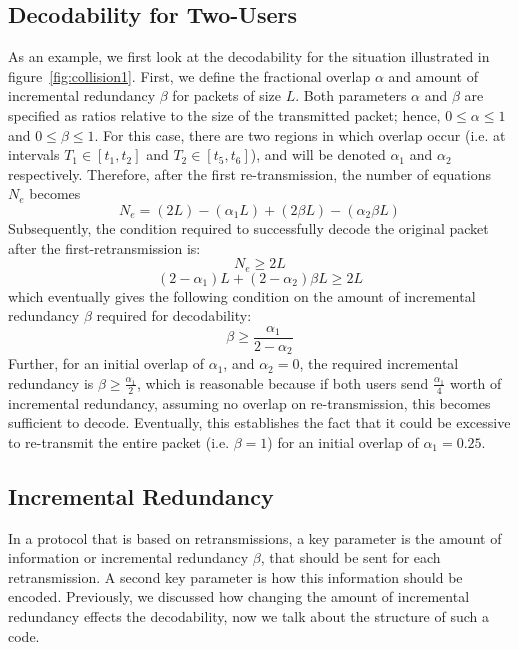 \subsection{Decodability for Two-Users}
\label{sec:two-user}
As an example, we first look at the decodability for the situation illustrated in figure~\ref{fig:collision1}. First, we define the fractional overlap $\alpha$ and amount of incremental redundancy $\beta$ for packets of size $L$. Both parameters $\alpha$ and $\beta$ are specified as ratios relative to the size of the transmitted packet; hence, $0\leq\alpha\leq1$ and $0\leq\beta\leq1$. For this case, there are two regions in which overlap occur (i.e. at intervals $T_1\in[t_1,t_2]$ and $T_2\in[t_5,t_6]$), and will be denoted $\alpha_1$ and $\alpha_2$ respectively. Therefore, after the first re-transmission, the number of equations $N_e$ becomes
\begin{equation}
\label{eq:Ne1}
N_e = (2L)-(\alpha_1 L)+(2\beta L)-(\alpha_2\beta L)
\end{equation}
Subsequently, the condition required to successfully decode the original packet after the first-retransmission is:
\begin{equation}
N_e \geq 2L
\end{equation}
\begin{equation}
(2-\alpha_1)L + (2-\alpha_2)\beta L \geq 2L
\end{equation}
which eventually gives the following condition on the amount of incremental redundancy $\beta$ required for decodability:
\begin{equation}
\beta \geq \frac{\alpha_1}{2-\alpha_2}
\end{equation}
Further, for an initial overlap of $\alpha_1$, and $\alpha_2=0$, the required incremental redundancy is $\beta \geq \frac{\alpha_1}{2}$, which is reasonable because if both users send $\frac{\alpha_1}{4}$ worth of incremental redundancy, assuming no overlap on re-transmission, this becomes sufficient to decode. Eventually, this establishes the fact that it could be excessive to re-transmit the entire packet (i.e. $\beta=1$) for an initial overlap of $\alpha_1=0.25$. 

\subsection{Incremental Redundancy}
\label{sec:IncRed}

In a protocol that is based on retransmissions, a key parameter is the amount of information
or incremental redundancy $\beta$, that should be sent for each retransmission. A second key parameter is how this information should be encoded. Previously, we discussed how changing the amount of incremental redundancy effects the decodability, now we talk about the structure of such a code.

